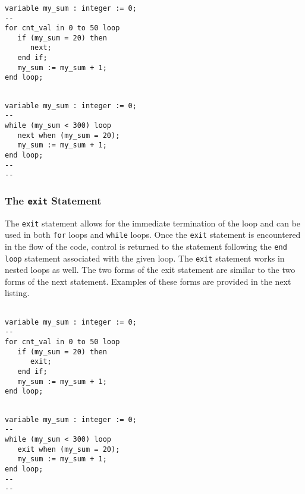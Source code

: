 \vspace{10pt}
\noindent
\begin{minipage}{0.5\linewidth}
\begin{lstlisting}

variable my_sum : integer := 0; 
--
for cnt_val in 0 to 50 loop
   if (my_sum = 20) then 
      next; 
   end if; 
   my_sum := my_sum + 1; 
end loop;
\end{lstlisting}
\end{minipage}
\noindent
\begin{minipage}{0.5\linewidth}
\begin{lstlisting}

variable my_sum : integer := 0; 
--
while (my_sum < 300) loop
   next when (my_sum = 20); 
   my_sum := my_sum + 1; 
end loop; 
--
--
\end{lstlisting}
\end{minipage}

\subsubsection{The \texttt{exit} Statement}
The \texttt{exit} statement allows for the immediate termination of the loop and can be used in both \texttt{for} loops and \texttt{while} loops. Once the \texttt{exit} statement is encountered in the flow of the code, control is returned to the statement following the \texttt{end loop} statement associated with the given loop. The \texttt{exit} statement works in nested loops as well. The two forms of the exit statement are similar to the two forms of the next statement. Examples of these forms are provided in the next listing.

\vspace{10pt}
\noindent
\begin{minipage}{0.5\linewidth}
\begin{lstlisting}

variable my_sum : integer := 0; 
--
for cnt_val in 0 to 50 loop
   if (my_sum = 20) then 
      exit; 
   end if; 
   my_sum := my_sum + 1; 
end loop; 
\end{lstlisting}
\end{minipage}
\noindent
\begin{minipage}{0.5\linewidth}
\begin{lstlisting}

variable my_sum : integer := 0; 
--
while (my_sum < 300) loop
   exit when (my_sum = 20); 
   my_sum := my_sum + 1; 
end loop; 
--
--
\end{lstlisting}
\end{minipage} 


